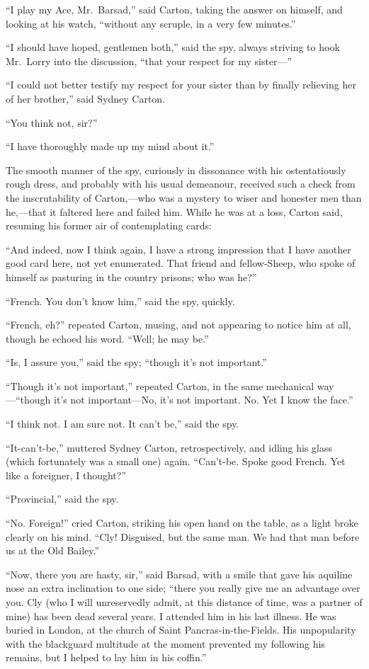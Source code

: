 ``I play my Ace, Mr.\ Barsad,'' said Carton, taking the answer on himself,
and looking at his watch, ``without any scruple, in a very few minutes.''

``I should have hoped, gentlemen both,'' said the spy, always striving
to hook Mr.\ Lorry into the discussion, ``that your respect for my
sister---''

``I could not better testify my respect for your sister than by
finally relieving her of her brother,'' said Sydney Carton.

``You think not, sir?''

``I have thoroughly made up my mind about it.''

The smooth manner of the spy, curiously in dissonance with his
ostentatiously rough dress, and probably with his usual demeanour,
received such a check from the inscrutability of Carton,---who was a
mystery to wiser and honester men than he,---that it faltered here and
failed him.  While he was at a loss, Carton said, resuming his former
air of contemplating cards:

``And indeed, now I think again, I have a strong impression that I
have another good card here, not yet enumerated.  That friend and
fellow-Sheep, who spoke of himself as pasturing in the country prisons;
who was he?''

``French.  You don't know him,'' said the spy, quickly.

``French, eh?'' repeated Carton, musing, and not appearing to notice
him at all, though he echoed his word.  ``Well; he may be.''

``Is, I assure you,'' said the spy; ``though it's not important.''

``Though it's not important,'' repeated Carton, in the same mechanical
way---``though it's not important---No, it's not important.  No. Yet I
know the face.''

``I think not.  I am sure not.  It can't be,'' said the spy.

``It-can't-be,'' muttered Sydney Carton, retrospectively, and idling
his glass (which fortunately was a small one) again.  ``Can't-be.
Spoke good French.  Yet like a foreigner, I thought?''

``Provincial,'' said the spy.

``No.  Foreign!'' cried Carton, striking his open hand on the table, as
a light broke clearly on his mind.  ``Cly!  Disguised, but the same man.
We had that man before us at the Old Bailey.''

``Now, there you are hasty, sir,'' said Barsad, with a smile that gave
his aquiline nose an extra inclination to one side; ``there you really
give me an advantage over you.  Cly (who I will unreservedly admit,
at this distance of time, was a partner of mine) has been dead
several years.  I attended him in his last illness.  He was buried in
London, at the church of Saint Pancras-in-the-Fields.  His unpopularity
with the blackguard multitude at the moment prevented my following
his remains, but I helped to lay him in his coffin.''

